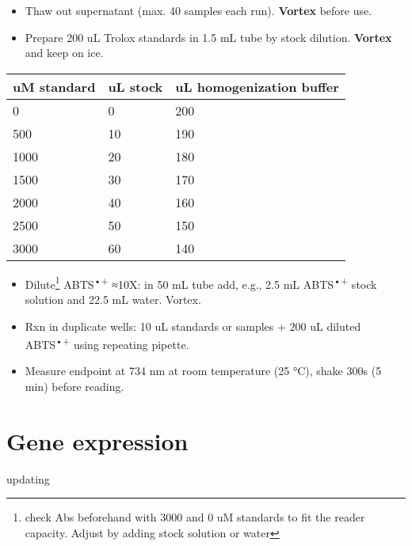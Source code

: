 \documentclass[
]{book}
\providecommand{\tightlist}{%
  \setlength{\itemsep}{0pt}\setlength{\parskip}{0pt}}
\begin{document}
\begin{itemize}
\tightlist
\item
  Thaw out supernatant (max. 40 samples each run). \textbf{Vortex} before use.
\item
  Prepare 200 uL Trolox standards in 1.5 mL tube by stock dilution. \textbf{Vortex} and keep on ice.
\end{itemize}

\begin{longtable}[]{@{}lll@{}}
\toprule()
uM standard & uL stock & uL homogenization buffer \\
\midrule()
\endhead
0 & 0 & 200 \\
500 & 10 & 190 \\
1000 & 20 & 180 \\
1500 & 30 & 170 \\
2000 & 40 & 160 \\
2500 & 50 & 150 \\
3000 & 60 & 140 \\
\bottomrule()
\end{longtable}

\begin{itemize}
\tightlist
\item
  Dilute\footnote{check Abs beforehand with 3000 and 0 uM standards to fit the reader capacity. Adjust by adding stock solution or water} ABTS\textsuperscript{•+} ≈10X: in 50 mL tube add, e.g., 2.5 mL ABTS\textsuperscript{•+} stock solution and 22.5 mL water. Vortex.
\item
  Rxn in duplicate wells: 10 uL standards or samples + 200 uL diluted ABTS\textsuperscript{•+} using repeating pipette.
\item
  Measure endpoint at 734 nm at room temperature (25 °C), shake 300s (5 min) before reading.
\end{itemize}

\hypertarget{gene-expression}{%
\chapter{Gene expression}\label{gene-expression}}

updating

\printbibliography
\end{document}
